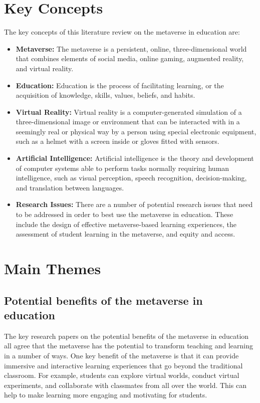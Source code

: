 \documentclass[12pt]{extarticle}
\begin{document}
\section{Key Concepts}
The key concepts of this literature review on the metaverse in education are:
\begin{itemize}
    \item \textbf{Metaverse:} The metaverse is a persistent, online, three-dimensional world that combines elements of social media, online gaming, augmented reality, and virtual reality.
    \item \textbf{Education:} Education is the process of facilitating learning, or the acquisition of knowledge, skills, values, beliefs, and habits.
    \item \textbf{Virtual Reality:} Virtual reality is a computer-generated simulation of a three-dimensional image or environment that can be interacted with in a seemingly real or physical way by a person using special electronic equipment, such as a helmet with a screen inside or gloves fitted with sensors.
    \item \textbf{Artificial Intelligence:} Artificial intelligence is the theory and development of computer systems able to perform tasks normally requiring human intelligence, such as visual perception, speech recognition, decision-making, and translation between languages.
    \item \textbf{Research Issues:} There are a number of potential research issues that need to be addressed in order to best use the metaverse in education. These include the design of effective metaverse-based learning experiences, the assessment of student learning in the metaverse, and equity and access.
\end{itemize}

\section{Main Themes}

\subsection{Potential benefits of the metaverse in education}

The key research papers on the potential benefits of the metaverse in education all agree that the metaverse has the potential to transform teaching and learning in a number of ways.
One key benefit of the metaverse is that it can provide immersive and interactive learning experiences that go beyond the traditional classroom. For example, students can explore virtual worlds, conduct virtual experiments, and collaborate with classmates from all over the world. This can help to make learning more engaging and motivating for students.
\end{document}
